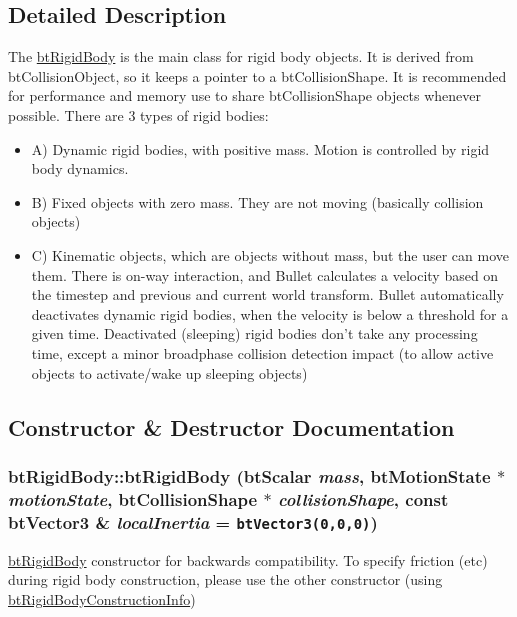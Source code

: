 \subsection{Detailed Description}
The \hyperlink{classbt_rigid_body}{btRigidBody} is the main class for rigid body objects. It is derived from btCollisionObject, so it keeps a pointer to a btCollisionShape. It is recommended for performance and memory use to share btCollisionShape objects whenever possible. There are 3 types of rigid bodies:\begin{itemize}
\item A) Dynamic rigid bodies, with positive mass. Motion is controlled by rigid body dynamics.\item B) Fixed objects with zero mass. They are not moving (basically collision objects)\item C) Kinematic objects, which are objects without mass, but the user can move them. There is on-way interaction, and Bullet calculates a velocity based on the timestep and previous and current world transform. Bullet automatically deactivates dynamic rigid bodies, when the velocity is below a threshold for a given time. Deactivated (sleeping) rigid bodies don't take any processing time, except a minor broadphase collision detection impact (to allow active objects to activate/wake up sleeping objects) \end{itemize}


\subsection{Constructor \& Destructor Documentation}
\hypertarget{classbt_rigid_body_ac9b7d050bc87644d38e9ffe4fe4c5ab}{
\subsubsection[btRigidBody]{\setlength{\rightskip}{0pt plus 5cm}btRigidBody::btRigidBody (btScalar {\em mass}, \/  {\bf btMotionState} $\ast$ {\em motionState}, \/  btCollisionShape $\ast$ {\em collisionShape}, \/  const btVector3 \& {\em localInertia} = {\tt btVector3(0,0,0)})}}
\label{classbt_rigid_body_ac9b7d050bc87644d38e9ffe4fe4c5ab}


\hyperlink{classbt_rigid_body}{btRigidBody} constructor for backwards compatibility. To specify friction (etc) during rigid body construction, please use the other constructor (using \hyperlink{structbt_rigid_body_1_1bt_rigid_body_construction_info}{btRigidBodyConstructionInfo}) 

